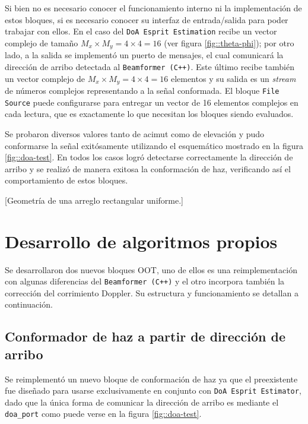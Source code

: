 \documentclass[../../main.tex]{subfiles}
\begin{document}
Si bien no es necesario conocer el funcionamiento interno ni la implementación de estos bloques, si es necesario conocer su interfaz de entrada/salida para poder trabajar con ellos. En el caso del \texttt{DoA Esprit Estimation} recibe un vector complejo de tamaño $M_x \times M_y = 4 \times 4 = 16$ (ver figura \ref{fig::theta-phi}); por otro lado, a la salida se implementó un puerto de mensajes, el cual comunicará la dirección de arribo detectada al \texttt{Beamformer (C++)}. Este último recibe también un vector complejo de $M_x \times M_y = 4 \times 4 = 16$ elementos y su salida es un \textit{stream} de números complejos representando a la señal conformada. El bloque \texttt{File Source} puede configurarse para entregar un vector de 16 elementos complejos en cada lectura, que es exactamente lo que necesitan los bloques siendo evaluados.

Se probaron diversos valores tanto de acimut como de elevación y pudo conformarse la señal exitósamente utilizando el esquemático mostrado en la figura \ref{fig::doa-test}. En todos los casos logró detectarse correctamente la dirección de arribo y se realizó de manera exitosa la conformación de haz, verificando así el comportamiento de estos bloques.

[Geometría de una arreglo rectangular uniforme.]


\section{Desarrollo de algoritmos propios}
Se desarrollaron dos nuevos bloques OOT, uno de ellos es una reimplementación con algunas diferencias del \texttt{Beamformer (C++)} y el otro incorpora también la corrección del corrimiento Doppler. Su estructura y funcionamiento se detallan a continuación.

\subsection{Conformador de haz a partir de dirección de arribo}
Se reimplementó un nuevo bloque de conformación de haz ya que el preexistente fue diseñado para usarse exclusivamente en conjunto con \texttt{DoA Esprit Estimator}, dado que la única forma de comunicar la dirección de arribo es mediante el \texttt{doa\_port} como puede verse en la figura \ref{fig::doa-test}. 
\end{document}

